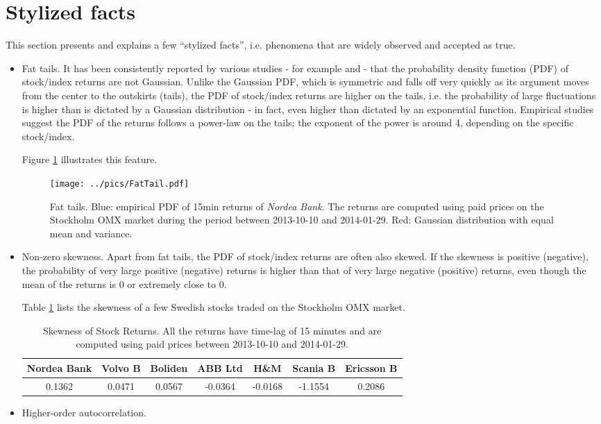 \documentclass{book}
\begin{document}
\section{Stylized facts}\label{sec:StylizedFacts}
This section presents and explains a few ``stylized facts'',
i.e. phenomena that are widely observed and accepted as true.
\begin{itemize}
\item Fat tails. It has been consistently reported by various studies
  - for example \cite{Potters2003} and \cite{Mantegna2000} - that the
  probability density function (PDF) of stock/index returns are not
  Gaussian. Unlike the Gaussian PDF, which is symmetric and falls off
  very quickly as its argument moves from the center to the outskirts
  (tails), the PDF of stock/index returns are higher on the tails,
  i.e. the probability of large fluctuations is higher than is dictated
  by a Gaussian distribution - in fact, even higher than dictated by
  an exponential function. Empirical studies suggest the PDF of the
  returns follows a power-law on the tails; the exponent of the power
  is around 4, depending on the specific stock/index.

  Figure \ref{fig:FatTail} illustrates this feature.
  \begin{figure}[htb!]
    \centering
    \texttt{[image: ../pics/FatTail.pdf]}
    \caption{\footnotesize Fat tails. Blue: empirical PDF of 15min returns of
      {\it Nordea Bank}. The returns are computed using paid
      prices on the Stockholm OMX market during the period between
      2013-10-10 and 2014-01-29. Red: Gaussian distribution with equal
      mean and variance.}
    \label{fig:FatTail}
  \end{figure}

\item Non-zero skewness. Apart from fat tails, the PDF of stock/index
  returns are often also skewed. If the skewness is positive
  (negative), the probability of very large positive (negative)
  returns is higher than that of very large negative (positive)
  returns, even though the mean of the returns is 0 or extremely
  close to 0.

  Table \ref{tab:EmpiricalSkewness} lists the skewness of a few
  Swedish stocks traded on the Stockholm OMX market.
  \begin{table}[htb!]
    \footnotesize
    \centering
    \begin{tabular}{c|c|c|c|c|c|c}
      Nordea Bank & Volvo B & Boliden & ABB Ltd & H\&M & Scania
      B & Ericsson B \\
      \hline
      0.1362 & 0.0471 & 0.0567 & -0.0364 & -0.0168 &
      -1.1554 & 0.2086 \\
    \end{tabular}
    \caption{\footnotesize Skewness of Stock Returns. All the returns
      have time-lag of 15 minutes and are computed using paid prices
      between 2013-10-10 and 2014-01-29. }
    \label{tab:EmpiricalSkewness}
  \end{table}

\item Higher-order autocorrelation. 
\end{itemize}
\end{document}
